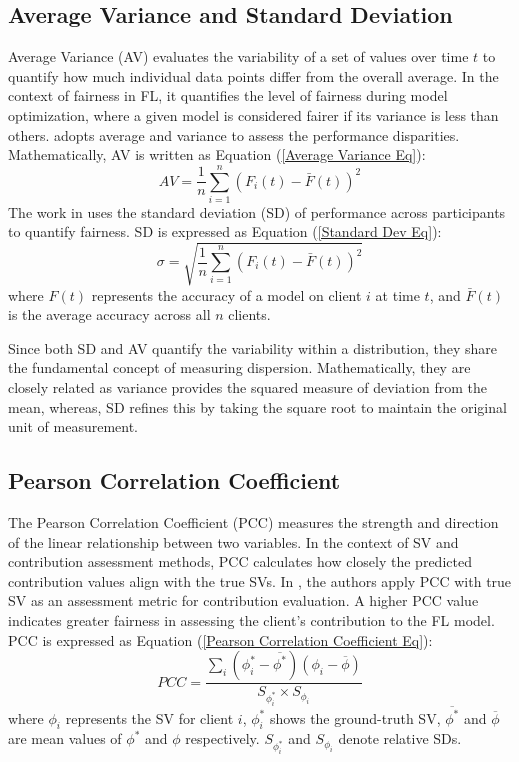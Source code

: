 \documentclass{article}
\begin{document}
\subsection{Average Variance and Standard Deviation} 
\label{SubSec: Average Variance}
Average Variance (AV) evaluates the variability of a set of values over time $t$ to quantify how much individual data points differ from the overall average. 
In the context of fairness in FL, it quantifies the level of fairness during model optimization, where a given model is considered fairer if its variance is less than others. \cite{wang2021FedFV} adopts average and variance to assess the performance disparities. Mathematically, AV is written as Equation (\ref{Average Variance Eq}):      
\begin{equation} \label{Average Variance Eq}
    AV = \frac{1}{n} \sum_{i=1}^{n} (F_{i}(t) - \bar{F}(t))^2 
\end{equation}
The work in \cite{chen2024fairCvpr,zhao2022participant} uses the standard deviation (SD) of performance across participants to quantify fairness. SD is expressed as Equation (\ref{Standard Dev Eq}):
\begin{equation} \label{Standard Dev Eq}
{
\sigma = \sqrt{\frac{1}{n} \sum_{i=1}^{n} (F_{i}(t) - \bar{F}(t))^2}
}
\end{equation}
where $F(t)$ represents the accuracy of a model on client $i$ at time $t$, and $\bar{F}(t)$ is the average accuracy across all $n$ clients. 

Since both SD and AV quantify the variability within a distribution, they share the fundamental concept of measuring dispersion. Mathematically, they are closely related as variance provides the squared measure of deviation from the mean, whereas, SD refines this by taking the square root to maintain the original unit of measurement.

\subsection{Pearson Correlation Coefficient} 
\label{SubSec: Pearson Correlation Coefficient}
The Pearson Correlation Coefficient (PCC) measures the strength and direction of the linear relationship between two variables. In the context of SV and contribution assessment methods, PCC calculates how closely the predicted contribution values align with the true SVs. 
In \cite{shi2022fedfaim}, the authors apply PCC with true SV as an assessment metric for contribution evaluation. A higher PCC value indicates greater fairness in assessing the client's contribution to the FL model. PCC is expressed as Equation (\ref{Pearson Correlation Coefficient Eq}):
\begin{equation} \label{Pearson Correlation Coefficient Eq}
       PCC = \frac{\sum_i (\phi^*_i-\overline{\phi^*}) (\phi_i-\overline\phi)}{S_{\phi^*_i} \times {S_{\phi_i}}}    
\end{equation} 
where $\phi_i$ represents the SV for client $i$, $\phi^*_i$ shows the ground-truth SV, 
$\overline{\phi^*}$ and $\overline\phi$ are mean values of $\phi^*$ and $\phi$ respectively. $S_{\phi^*_i}$ and ${S_{\phi_i}}$ denote relative SDs.
\end{document}
